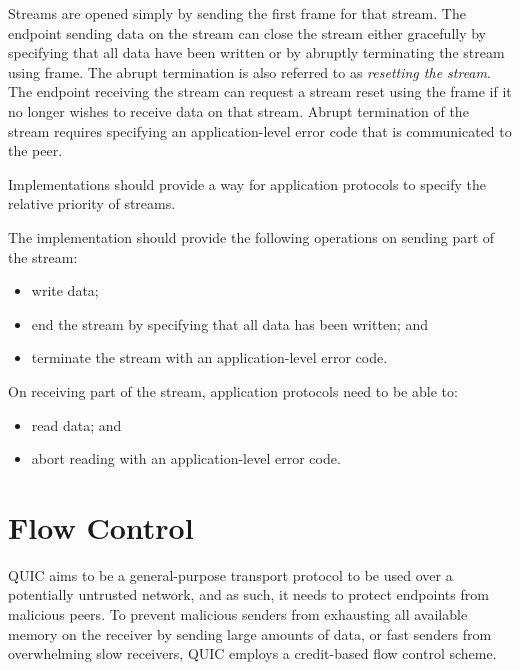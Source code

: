 Streams are opened simply by sending the first \STREAM{} frame for that stream. The endpoint sending
data on the stream can close the stream either gracefully by specifying that all data have been
written or by abruptly terminating the stream using \RESETSTREAM{} frame. The abrupt termination is
also referred to as \textit{resetting the stream}. The endpoint receiving the stream can request a
stream reset using the \STOPSENDING{} frame if it no longer wishes to receive data on that stream.
Abrupt termination of the stream requires specifying an application-level error code that is
communicated to the peer.

Implementations should provide a way for application protocols to specify the relative priority of
streams.

The implementation should provide the following operations on sending part of the stream:

\begin{itemize}

  \item write data;

  \item end the stream by specifying that all data has been written; and

  \item terminate the stream with an application-level error code.

\end{itemize}

On receiving part of the stream, application protocols need to be able to:

\begin{itemize}

  \item read data; and

  \item abort reading with an application-level error code.

\end{itemize}

\section{Flow Control}

QUIC aims to be a general-purpose transport protocol to be used over a potentially untrusted
network, and as such, it needs to protect endpoints from malicious peers. To prevent malicious
senders from exhausting all available memory on the receiver by sending large amounts of data, or
fast senders from overwhelming slow receivers, QUIC employs a credit-based flow control scheme.

